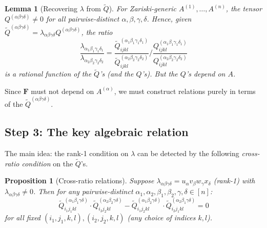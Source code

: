 \documentclass[12pt]{article}
\newtheorem{lemma}[theorem]{Lemma}
\newtheorem{proposition}[theorem]{Proposition}
\begin{document}
\begin{lemma}[Recovering $\lambda$ from $\tilde{Q}$]
  \label{lem:recover}
  For Zariski-generic $A^{(1)},\ldots,A^{(n)}$, the tensor $Q^{(\alpha\beta\gamma\delta)}\neq 0$ for all pairwise-distinct $\alpha,\beta,\gamma,\delta$.  Hence, given $\tilde{Q}^{(\alpha\beta\gamma\delta)} = \lambda_{\alpha\beta\gamma\delta}Q^{(\alpha\beta\gamma\delta)}$, the ratio
  \[
    \frac{\lambda_{\alpha_1\beta_1\gamma_1\delta_1}}{\lambda_{\alpha_2\beta_2\gamma_2\delta_2}}
    = \frac{\tilde{Q}^{(\alpha_1\beta_1\gamma_1\delta_1)}_{ijkl}}{\tilde{Q}^{(\alpha_2\beta_2\gamma_2\delta_2)}_{ijkl}}\bigg/
      \frac{Q^{(\alpha_1\beta_1\gamma_1\delta_1)}_{ijkl}}{Q^{(\alpha_2\beta_2\gamma_2\delta_2)}_{ijkl}}
  \]
  is a rational function of the $\tilde{Q}$'s (and the $Q$'s).  But the $Q$'s depend on $A$.
\end{lemma}

Since $\mathbf{F}$ must not depend on $A^{(\alpha)}$, we must construct relations purely in terms of the $\tilde{Q}^{(\alpha\beta\gamma\delta)}$.

\subsection*{Step 3: The key algebraic relation}

The main idea: the rank-1 condition on $\lambda$ can be detected by the following \emph{cross-ratio condition} on the $\tilde{Q}$'s.

\begin{proposition}[Cross-ratio relations]
  \label{prop:cross-ratio}
  Suppose $\lambda_{\alpha\beta\gamma\delta} = u_\alpha v_\beta w_\gamma x_\delta$ (rank-1) with $\lambda_{\alpha\beta\gamma\delta}\neq 0$.  Then for any pairwise-distinct $\alpha_1,\alpha_2,\beta_1,\beta_2,\gamma,\delta\in[n]$:
  \begin{equation}
    \label{eq:F-rel}
    \tilde{Q}^{(\alpha_1\beta_1\gamma\delta)}_{i_1 j_1 kl}
    \cdot\tilde{Q}^{(\alpha_2\beta_2\gamma\delta)}_{i_2 j_2 kl}
    - \tilde{Q}^{(\alpha_1\beta_2\gamma\delta)}_{i_1 j_2 kl}
    \cdot\tilde{Q}^{(\alpha_2\beta_1\gamma\delta)}_{i_2 j_1 kl} = 0
  \end{equation}
  for all fixed $(i_1,j_1,k,l), (i_2,j_2,k,l)$ (any choice of indices $k,l$).
\end{proposition}
\end{document}
